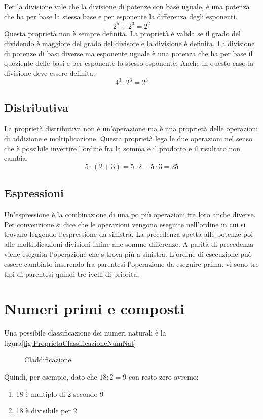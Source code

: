 Per la divisione vale che la divisione di potenze con base uguale, è una potenza che ha per base la stessa base e per esponente la differenza degli esponenti.\[ 2^5\div 2^3=2^2 \]Questa proprietà non è sempre definita. La proprietà è valida se il grado del dividendo è maggiore del grado del divisore e la divisione è definita.  La divisione di potenze di basi diverse ma esponente uguale è una potenza che ha per base il quoziente delle basi e per esponente lo stesso esponente. Anche in questo caso la divisione deve essere definita.\[4^3\cdot 2^3=2^3\] 
\subsection{Distributiva}
\label{sec:distibutivaInN}
La proprietà distributiva non è un'operazione ma è una proprietà delle operazioni di addizione e moltiplicazione. Questa proprietà lega le due operazioni nel senso che è possibile invertire l'ordine fra la somma e il prodotto e il risultato non cambia. \[ 5\cdot(2+3)=5\cdot 2+ 5\cdot 3=25\]
\subsection{Espressioni}
\label{sec:EspressioniNumeri Naturali}
Un'espressione è la combinazione di una po più operazioni fra loro anche diverse. Per convenzione si dice che le operazioni vengono eseguite nell'ordine in cui si trovano leggendo l'espressione da sinistra. La precedenza spetta alle potenze poi alle moltiplicazioni divisioni infine alle somme differenze. A parità di precedenza viene eseguita l'operazione che s trova più a sinistra. L'ordine di esecuzione può essere  cambiato inserendo fra parentesi l'operazione da eseguire prima. vi sono tre tipi di parentesi quindi tre ivelli di priorità.
\section{Numeri primi e composti}
\label{sec:Numeriprimiecomposti}
Una possibile classificazione dei numeri naturali è la figura\nobs\vref{fig:ProprietaClassificazioneNumNat}
\begin{figure} %
	\centering

	\caption{Claddificazione}
	\label{fig:ProprietaClassificazioneNumNat}\end{figure}
Quindi, per esempio, dato che $18:2=9$ con resto zero avremo:
\begin{enumerate}
	\item 18 è multiplo di 2 secondo 9
	\item 18 è divisibile per 2
\end{enumerate}
